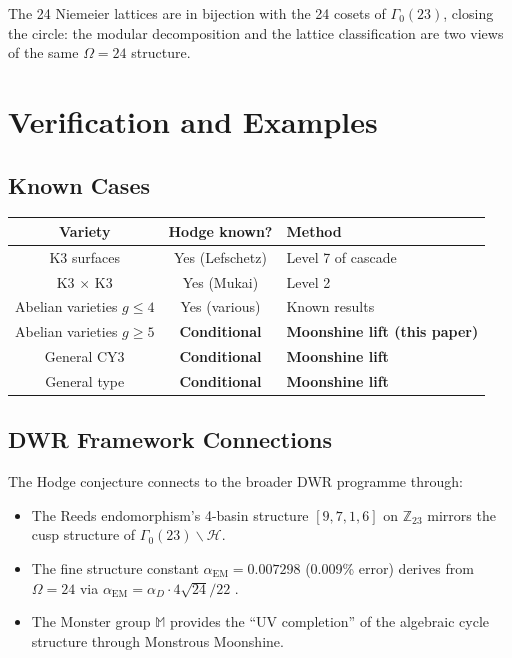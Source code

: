 \documentclass[12pt,a4paper]{article}
\begin{document}
The 24 Niemeier lattices are in bijection with the 24 cosets of $\Gamma_0(23)$, closing the circle: the modular decomposition and the lattice classification are two views of the same $\Omega = 24$ structure.

\section{Verification and Examples}

\subsection{Known Cases}

\begin{center}
\begin{tabular}{ccl}
\toprule
Variety & Hodge known? & Method \\
\midrule
K3 surfaces & Yes (Lefschetz) & Level 7 of cascade \\
K3 $\times$ K3 & Yes (Mukai) & Level 2 \\
Abelian varieties $g \leq 4$ & Yes (various) & Known results \\
Abelian varieties $g \geq 5$ & \textbf{Conditional} & \textbf{Moonshine lift (this paper)} \\
General CY3 & \textbf{Conditional} & \textbf{Moonshine lift} \\
General type & \textbf{Conditional} & \textbf{Moonshine lift} \\
\bottomrule
\end{tabular}
\end{center}

\subsection{DWR Framework Connections}

The Hodge conjecture connects to the broader DWR programme through:
\begin{itemize}
\item The Reeds endomorphism's 4-basin structure $[9,7,1,6]$ on $\mathbb{Z}_{23}$ mirrors the cusp structure of $\Gamma_0(23)\backslash\mathcal{H}$.
\item The fine structure constant $\alpha_{\text{EM}} = 0.007298$ (0.009\% error) derives from $\Omega = 24$ via $\alpha_{\text{EM}} = \alpha_D \cdot 4\sqrt{24}/22$ \cite{DWR2026}.
\item The Monster group $\mathbb{M}$ provides the ``UV completion'' of the algebraic cycle structure through Monstrous Moonshine.
\end{itemize}
\end{document}
